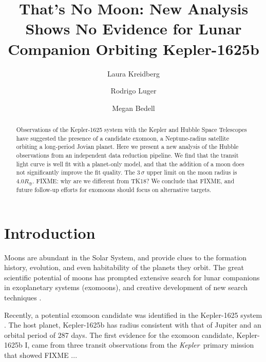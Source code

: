 \documentclass[twocolumn]{aastex62}
\newcommand{\project}[1]{\textsl{#1}}
\newcommand{\Kepler}{\project{Kepler}}
\begin{document}
\title{That's No Moon: New Analysis Shows No Evidence for Lunar Companion Orbiting Kepler-1625b}

\author{Laura Kreidberg}
\author{Rodrigo Luger}
\author{Megan Bedell}

\begin{abstract}
    Observations of the Kepler-1625 system with the Kepler and Hubble Space Telescopes have suggested the presence of a candidate exomoon, a Neptune-radius satellite orbiting a long-period Jovian planet. Here we present a new analysis of the Hubble observations from an independent data reduction pipeline. We find that the transit light curve is well fit with a planet-only model, and that the addition of a moon does not significantly improve the fit quality. The $3\,\sigma$ upper limit on the moon radius is $4.0R_\oplus$. FIXME: why are we different from TK18?  We conclude that FIXME, and future follow-up efforts for exomoons should focus on alternative targets.
\end{abstract}


\section{Introduction} \label{sec:intro}
Moons are abundant in the Solar System, and provide clues to the formation history, evolution, and even habitability of the planets they orbit. The great scientific potential of moons has prompted extensive search for lunar companions in exoplanetary systems (exomoons), and creative development of new search techniques \citep[e.g.][]{kipping09a, kipping09b, kipping13, simon10, peters13, heller14, noyola14, hippke15, agol15, sengupta16, vanderburg18}. 

Recently, a potential exomoon candidate was identified in the Kepler-1625 system \citep{teachey18a}. The host planet, Kepler-1625b has radius consistent with that of Jupiter and an orbital period of 287 days.  The first evidence for the exomoon candidate, Kepler-1625b I, came from three transit observations from the \Kepler\ primary mission that showed FIXME \citep{teachey18a}...


\end{document}
